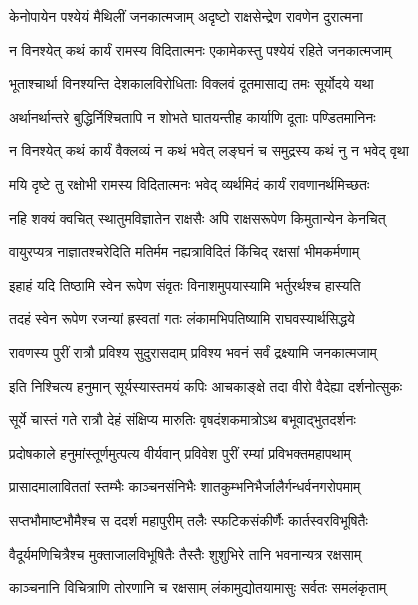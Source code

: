 \twolineshloka
{केनोपायेन पश्येयं मैथिलीं जनकात्मजाम्}
{अदृष्टो राक्षसेन्द्रेण रावणेन दुरात्मना} %

\twolineshloka
{न विनश्येत् कथं कार्यं रामस्य विदितात्मनः}
{एकामेकस्तु पश्येयं रहिते जनकात्मजाम्} %

\twolineshloka
{भूताश्चार्था विनश्यन्ति देशकालविरोधिताः}
{विक्लवं दूतमासाद्य तमः सूर्योदये यथा} %

\twolineshloka
{अर्थानर्थान्तरे बुद्धिर्निश्चितापि न शोभते}
{घातयन्तीह कार्याणि दूताः पण्डितमानिनः} %

\twolineshloka
{न विनश्येत् कथं कार्यं वैक्लव्यं न कथं भवेत्}
{लङ्घनं च समुद्रस्य कथं नु न भवेद् वृथा} %

\twolineshloka
{मयि दृष्टे तु रक्षोभी रामस्य विदितात्मनः}
{भवेद् व्यर्थमिदं कार्यं रावणानर्थमिच्छतः} %

\twolineshloka
{नहि शक्यं क्वचित् स्थातुमविज्ञातेन राक्षसैः}
{अपि राक्षसरूपेण किमुतान्येन केनचित्} %

\twolineshloka
{वायुरप्यत्र नाज्ञातश्चरेदिति मतिर्मम}
{नह्यत्राविदितं किंचिद् रक्षसां भीमकर्मणाम्} %

\twolineshloka
{इहाहं यदि तिष्ठामि स्वेन रूपेण संवृतः}
{विनाशमुपयास्यामि भर्तुरर्थश्च हास्यति} %

\twolineshloka
{तदहं स्वेन रूपेण रजन्यां ह्रस्वतां गतः}
{लंकामभिपतिष्यामि राघवस्यार्थसिद्धये} %

\twolineshloka
{रावणस्य पुरीं रात्रौ प्रविश्य सुदुरासदाम्}
{प्रविश्य भवनं सर्वं द्रक्ष्यामि जनकात्मजाम्} %

\twolineshloka
{इति निश्चित्य हनुमान् सूर्यस्यास्तमयं कपिः}
{आचकाङ्क्षे तदा वीरो वैदेह्या दर्शनोत्सुकः} %

\twolineshloka
{सूर्ये चास्तं गते रात्रौ देहं संक्षिप्य मारुतिः}
{वृषदंशकमात्रोऽथ बभूवाद्भुतदर्शनः} %

\twolineshloka
{प्रदोषकाले हनुमांस्तूर्णमुत्पत्य वीर्यवान्}
{प्रविवेश पुरीं रम्यां प्रविभक्तमहापथाम्} %

\twolineshloka
{प्रासादमालाविततां स्तम्भैः काञ्चनसंनिभैः}
{शातकुम्भनिभैर्जालैर्गन्धर्वनगरोपमाम्} %

\twolineshloka
{सप्तभौमाष्टभौमैश्च स ददर्श महापुरीम्}
{तलैः स्फटिकसंकीर्णैः कार्तस्वरविभूषितैः} %

\twolineshloka
{वैदूर्यमणिचित्रैश्च मुक्ताजालविभूषितैः}
{तैस्तैः शुशुभिरे तानि भवनान्यत्र रक्षसाम्} %

\twolineshloka
{काञ्चनानि विचित्राणि तोरणानि च रक्षसाम्}
{लंकामुद्योतयामासुः सर्वतः समलंकृताम्} %

